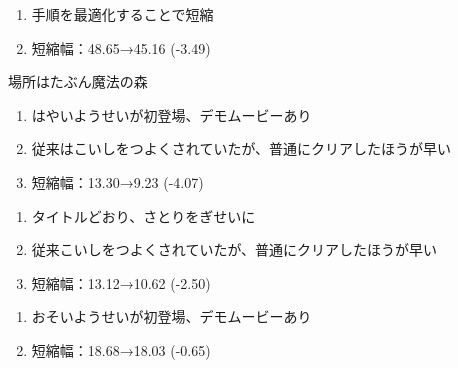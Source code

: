 \begin{enumerate}[label={\sarrow}]
\item 手順を最適化することで短縮
\item 短縮幅：48.65→45.16 (-3.49)
\end{enumerate}





場所はたぶん魔法の森



\begin{enumerate}[label={\sarrow}]
\item はやいようせいが初登場、デモムービーあり
\item 従来はこいしをつよくされていたが、普通にクリアしたほうが早い
\item 短縮幅：13.30→9.23 (-4.07)
\end{enumerate}



\begin{enumerate}[label={\sarrow}]
\item タイトルどおり、さとりをぎせいに
\item 従来こいしをつよくされていたが、普通にクリアしたほうが早い
\item 短縮幅：13.12→10.62 (-2.50)
\end{enumerate}



\begin{enumerate}[label={\sarrow}]
\item おそいようせいが初登場、デモムービーあり
\item 短縮幅：18.68→18.03 (-0.65)
\end{enumerate}



